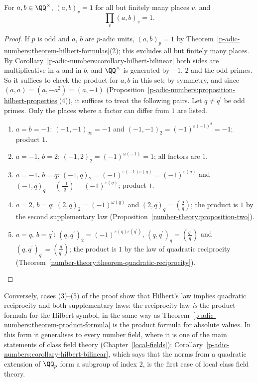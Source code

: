 \begin{theorem}\label{p-adic-numbers:theorem-hilbert-reciprocity}
For $a, b \in \QQ^\times$, $(a, b)_v = 1$ for all but finitely many places $v$, and
\[
\prod_v(a, b)_v = 1 .
\]
\end{theorem}

\begin{proof}
If $p$ is odd and $a$, $b$ are $p$-adic units, $(a, b)_p = 1$ by Theorem~\ref{p-adic-numbers:theorem-hilbert-formulas}(2); this excludes all but finitely many places. By
Corollary~\ref{p-adic-numbers:corollary-hilbert-bilinear} both sides are multiplicative in $a$ and in $b$, and $\QQ^\times$ is generated by $-1$, $2$ and the odd primes. So it suffices to check the product for
$a, b$ in this set; by symmetry, and since $(a, a) = (a, -a^2) = (a, -1)$ (Proposition~\ref{p-adic-numbers:proposition-hilbert-properties}(4)), it suffices to treat the following pairs. Let $q \neq q^{\prime}$ be odd primes. Only the places where a
factor can differ from $1$ are listed.
\begin{enumerate}
\item $a = b = -1$: $(-1, -1)_\infty = -1$ and $(-1, -1)_2 = (-1)^{\varepsilon(-1)^2} = -1$; product $1$.
\item $a = -1$, $b = 2$: $(-1, 2)_2 = (-1)^{\omega(-1)} = 1$; all factors are $1$.
\item $a = -1$, $b = q$: $(-1, q)_2 = (-1)^{\varepsilon(-1)\varepsilon(q)} = (-1)^{\varepsilon(q)}$ and $(-1, q)_q = (\frac{-1}{q}) = (-1)^{\varepsilon(q)}$; product $1$.
\item $a = 2$, $b = q$: $(2, q)_2 = (-1)^{\omega(q)}$ and $(2, q)_q = (\frac 2q)$; the product is $1$ by the second supplementary law (Proposition~\ref{number-theory:proposition-two}).
\item $a = q$, $b = q^{\prime}$: $(q, q^{\prime})_2 = (-1)^{\varepsilon(q)\varepsilon(q^{\prime})}$, $(q, q^{\prime})_q = (\frac{q^{\prime}}{q})$ and $(q, q^{\prime})_{q^{\prime}} = (\frac{q}{q^{\prime}})$; the product is $1$ by the law of quadratic
reciprocity (Theorem~\ref{number-theory:theorem-quadratic-reciprocity}).
\end{enumerate}
\end{proof}

\begin{remark}\label{p-adic-numbers:remark-hilbert-reciprocity}
Conversely, cases (3)--(5) of the proof show that Hilbert's law implies quadratic reciprocity and both supplementary laws: the reciprocity law \emph{is} the product formula for the Hilbert symbol, in
the same way as Theorem~\ref{p-adic-numbers:theorem-product-formula} is the product formula for absolute values. In this form it generalises to every number field, where it is one of the main
statements of class field theory (Chapter~\ref{local-fields}); Corollary~\ref{p-adic-numbers:corollary-hilbert-bilinear}, which says that the norms from a quadratic extension of $\QQ_p$ form a subgroup
of index $2$, is the first case of local class field theory.
\end{remark}

